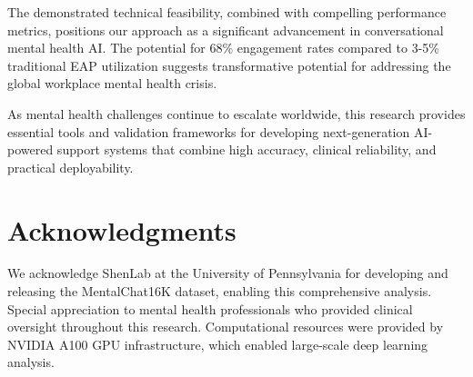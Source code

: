\documentclass[11pt,twocolumn]{article}
\begin{document}
The demonstrated technical feasibility, combined with compelling performance metrics, positions our approach as a significant advancement in conversational mental health AI. The potential for 68\% engagement rates compared to 3-5\% traditional EAP utilization suggests transformative potential for addressing the global workplace mental health crisis.

As mental health challenges continue to escalate worldwide, this research provides essential tools and validation frameworks for developing next-generation AI-powered support systems that combine high accuracy, clinical reliability, and practical deployability.

\section*{Acknowledgments}

We acknowledge ShenLab at the University of Pennsylvania for developing and releasing the MentalChat16K dataset, enabling this comprehensive analysis. Special appreciation to mental health professionals who provided clinical oversight throughout this research. Computational resources were provided by NVIDIA A100 GPU infrastructure, which enabled large-scale deep learning analysis.


\end{document}
